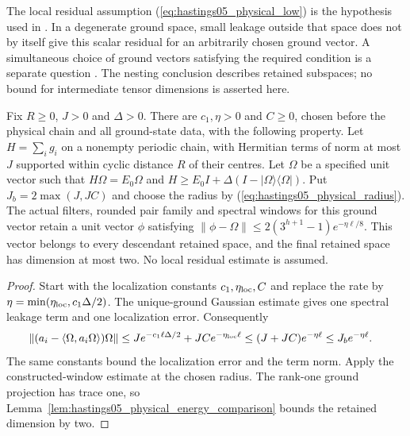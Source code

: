 The local residual assumption
(\ref{eq:hastings05_physical_low}) is the hypothesis used in
\cite[eq.~(low), lines 493--507 and 633--639]{Hastings2006Solving}.
In a degenerate ground space, small leakage outside that space does not
by itself give this scalar residual for an arbitrarily chosen ground
vector. A simultaneous choice of ground vectors satisfying the required
condition is a separate question
\cite{gap:hastings05_two_dim_ground_basis}. The nesting conclusion
describes retained subspaces; no bound for intermediate tensor dimensions
is asserted here.

\begin{lemma}
    \label{cor:hastings05_unique_physical_hierarchy}
    \leanok
    Fix $R\ge0$, $J>0$ and $\Delta>0$. There are $c_1,\eta>0$ and
    $C\ge0$, chosen before the physical chain and all ground-state data,
    with the following property. Let $H=\sum_i g_i$ on a nonempty
    periodic chain, with Hermitian terms of norm at most $J$ supported
    within cyclic distance $R$ of their centres. Let $\Omega$ be a
    specified unit vector such that
    $H\Omega=E_0\Omega$ and
    $H\ge E_0I+\Delta(I-|\Omega\rangle\langle\Omega|)$.
    Put $J_b=2\max(J,JC)$ and choose the radius by
    (\ref{eq:hastings05_physical_radius}). The actual filters, rounded
    pair family and spectral windows for this ground vector retain a
    unit vector $\phi$ satisfying
    $\|\phi-\Omega\|\le2(3^{h+1}-1)e^{-\eta\ell/8}$.
    This vector belongs to every descendant retained space, and the
    final retained space has dimension at most two. No local residual
    estimate is assumed.
\end{lemma}
\begin{proof}\leanok
    Start with the localization constants $c_1,\eta_{\rm loc},C$ and
    replace the rate by $\eta=\min(\eta_{\rm loc},c_1\Delta/2)$.
    The unique-ground Gaussian estimate gives one spectral leakage
    term and one localization error. Consequently
    \begin{align}
        \|(a_i-\langle\Omega,a_i\Omega\rangle)\Omega\|
        &\le J e^{-c_1\ell\Delta/2}+JC e^{-\eta_{\rm loc}\ell}
         \le (J+JC)e^{-\eta\ell}
         \le J_b e^{-\eta\ell}.
        \label{eq:hastings05_unique_physical_low}
    \end{align}
    The same constants bound the localization error and the term norm.
    Apply the constructed-window estimate at the chosen radius. The
    rank-one ground projection has trace one, so
    Lemma~\ref{lem:hastings05_physical_energy_comparison} bounds the
    retained dimension by two.
\end{proof}

